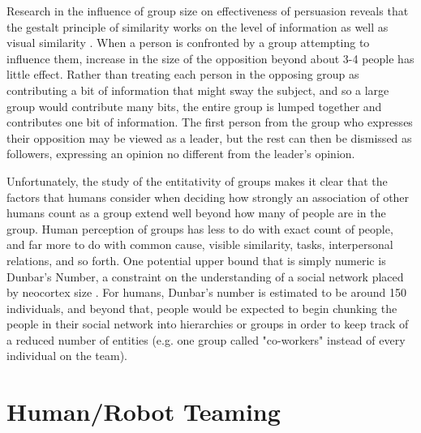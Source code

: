 Research in the influence of group size on effectiveness of persuasion reveals that the gestalt principle of similarity works on the level of information as well as visual similarity \citep{wilder1977perception}. 
When a person is confronted by a group attempting to influence them, increase in the size of the opposition beyond about 3-4 people has little effect. 
Rather than treating each person in the opposing group as contributing a bit of information that might sway the subject, and so a large group would contribute many bits, the entire group is lumped together and contributes one bit of information. 
The first person from the group who expresses their opposition may be viewed as a leader, but the rest can then be dismissed as followers, expressing an opinion no different from the leader's opinion. 

Unfortunately, the study of the entitativity of groups makes it clear that the factors that humans consider when deciding how strongly an association of other humans count as a group extend well beyond how many of people are in the group.
Human perception of groups has less to do with exact count of people, and far more to do with common cause, visible similarity, tasks, interpersonal relations, and so forth. 
One potential upper bound that is simply numeric is Dunbar's Number, a constraint on the understanding of a social network placed by neocortex size \citep{dunbar1992neocortex}. 
For humans, Dunbar's number is estimated to be around 150 individuals, and beyond that, people would be expected to begin chunking the people in their social network into hierarchies or groups in order to keep track of a reduced number of entities (e.g. one group called "co-workers" instead of every individual on the team). 

\section{Human/Robot Teaming} \label{section:human_robot_teaming}

